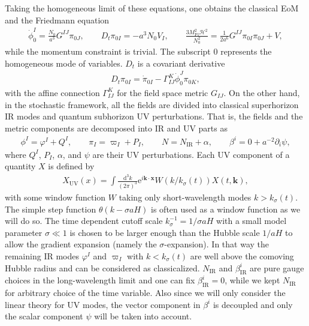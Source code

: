 \documentclass[a4paper,11pt]{article}
\newcommand{\dd}{\mathrm{d}}
\newcommand{\ee}{\mathrm{e}}
\newcommand{\Mpl}{M_\text{Pl}}
\newcommand{\IR}{\text{IR}}
\newcommand{\UV}{\text{UV}}
\newcommand{\dk}{\frac{\dd^3k}{(2\pi)^3}}
\newcommand{\kdx}{\mathbf{k}\cdot\mathbf{x}}
\newcommand{\calH}{\mathcal{H}}
\newcommand{\bae}[1]{\begin{align} #1 \end{align}}
\begin{document}
Taking the homogeneous limit of these equations, one obtains the classical EoM and the Friedmann equation
\bae{\label{eq: classical EoM}
	\dot{\phi}^I_0=\frac{N_0}{a^3}G^{IJ}\pi_{0J}, \quad\quad D_t\pi_{0I}=-a^3N_0V_I, \quad\quad 
	\frac{3\Mpl^2\calH^2}{N_0^2}=\frac{1}{2a^6}G^{IJ}\pi_{0I}\pi_{0J}+V,
}
while the momentum constraint is trivial. The subscript $0$ represents the homogeneous mode of variables.
$D_t$ is a covariant derivative
\bae{
	D_t\pi_{0I}=\dot{\pi}_{0I}-\Gamma_{IJ}^K\dot{\phi}_0^J\pi_{0K},
}
with the affine connection $\Gamma_{IJ}^K$ for the field space metric $G_{IJ}$.
On the other hand, in the stochastic framework, all the fields are divided into classical superhorizon IR modes and 
quantum subhorizon UV perturbations. That is, the fields and the metric components are decomposed into IR and UV parts as
\bae{\label{eq: IRUV decomposition}
	\phi^I=\varphi^I+Q^I, \quad\quad \pi_I=\varpi_I+P_I, \quad\quad N=N_\IR+\alpha, \quad\quad \beta^i=0+a^{-2}\partial_i\psi,
}
where $Q^I$, $P_I$, $\alpha$, and $\psi$ are their UV perturbations.
Each UV component of a quantity $X$ is defined by
\bae{
	X_\UV(x)=\int\dk\ee^{i\kdx}W(k/k_\sigma(t))X(t,\mathbf{k}),
}
with some window function $W$ taking only short-wavelength modes $k>k_\sigma(t)$.
The simple step function $\theta(k-\sigma aH)$ is often used as a window function as we will do so.
The time dependent cutoff scale $k_\sigma^{-1}=1/\sigma aH$ with a small model parameter $\sigma\ll1$ 
is chosen to be larger enough than the Hubble scale
$1/aH$ to allow the gradient expansion (namely the $\sigma$-expansion). 
In that way the remaining IR modes $\varphi^I$ and $\varpi_I$ with $k<k_\sigma(t)$ are well above the comoving Hubble radius
and can be considered as classicalized.
$N_\IR$ and $\beta^i_\IR$ are pure gauge choices in the long-wavelength limit
and one can fix $\beta^i_\IR=0$, while we kept $N_\IR$ for arbitrary choice of the time variable. 
Also since we will only consider the linear theory for UV modes, the vector component in $\beta^i$ is decoupled and 
only the scalar component $\psi$ will be taken into account.
\end{document}
